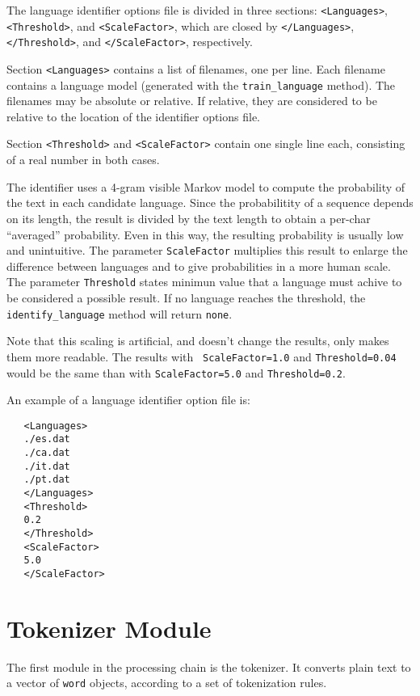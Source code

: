 \documentclass[a4paper]{book}
\begin{document}
  The language identifier options file is divided in three sections:
  \verb#<Languages>#, \verb#<Threshold>#, and \verb#<ScaleFactor>#,
  which are closed by \verb#</Languages>#, \verb#</Threshold>#, and
  \verb#</ScaleFactor>#, respectively.

  Section \verb#<Languages># contains a list of filenames, one per
  line. Each filename contains a language model (generated with the
  \verb#train_language# method). The filenames may be absolute or
  relative. If relative, they are considered to be relative to the
  location of the identifier options file.

  Section \verb#<Threshold># and \verb#<ScaleFactor># contain one
  single line each, consisting of a real number in both cases.

  The identifier uses a 4-gram visible Markov model to compute the
  probability of the text in each candidate language. Since the
  probabilitity of a sequence depends on its length, the result is
  divided by the text length to obtain a per-char ``averaged''
  probability. Even in this way, the resulting probability is usually
  low and unintuitive. The parameter \verb#ScaleFactor# multiplies
  this result to enlarge the difference between languages and to give
  probabilities in a more human scale.  The parameter \verb#Threshold#
  states minimun value that a language must achive to be considered a
  possible result. If no language reaches the threshold, the
  \verb#identify_language# method will return {\tt none}.

  Note that this scaling is artificial, and doesn't change the
  results, only makes them more readable. The results with {\tt
    ScaleFactor=1.0} and {\tt Threshold=0.04} would be the same than
  with {\tt ScaleFactor=5.0} and {\tt Threshold=0.2}.

 An example of a language identifier option file is:
\begin{verbatim}
   <Languages>
   ./es.dat
   ./ca.dat
   ./it.dat
   ./pt.dat
   </Languages>
   <Threshold>
   0.2
   </Threshold>
   <ScaleFactor>
   5.0
   </ScaleFactor>
\end{verbatim}


\section{Tokenizer Module}
\label{file-tok}

  The first module in the processing chain is the tokenizer. It
  converts plain text to a vector of {\tt word} objects, according to
  a set of tokenization rules.
\end{document}
